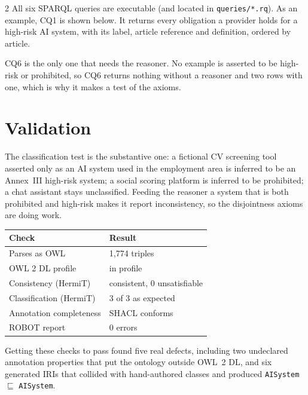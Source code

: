 \documentclass[10pt,a4paper]{article}
\begin{document}
\begin{multicols}{2}
All six SPARQL queries are executable (and located in \texttt{queries/*.rq}). 
As an example, CQ1 is shown below. It returns every obligation a provider holds for a high-risk AI
system, with its label, article reference and definition, ordered by article.


CQ6 is the only one that needs the reasoner.
No example is asserted to be high-risk or prohibited, so CQ6 returns nothing without a reasoner and two rows with one, which is why it makes a test of the axioms.
% 

\section{Validation}

The classification test is the substantive one: a fictional CV screening tool asserted only as an AI
system used in the employment area is inferred to be an Annex~III high-risk system; a social scoring
platform is inferred to be prohibited; a chat assistant stays unclassified. Feeding the reasoner a
system that is both prohibited and high-risk makes it report inconsistency, so the disjointness
axioms are doing work.
\vspace{-0.5cm}
\begin{table}[H]
      \centering
      \scriptsize
      \begin{tabular*}{0.9\columnwidth}{@{\quad}l@{\extracolsep\fill}l@{\qquad}}
            \toprule
            \textbf{Check} & \textbf{Result} \\
            \midrule
            Parses as OWL & 1{,}774 triples \\
            OWL 2 DL profile & in profile \\
            Consistency (HermiT) & consistent, 0 unsatisfiable \\
            Classification (HermiT) & 3 of 3 as expected \\
            Annotation completeness & SHACL conforms \\
            ROBOT report & 0 errors \\
            \bottomrule
      \end{tabular*}
\end{table}
\vspace{-0.6cm}
Getting these checks to pass found five real defects, including two undeclared annotation properties
that put the ontology outside OWL~2 DL, and six generated IRIs that collided with hand-authored
classes and produced \texttt{AISystem} $\sqsubseteq$ \texttt{AISystem}.


\end{multicols}
\end{document}
